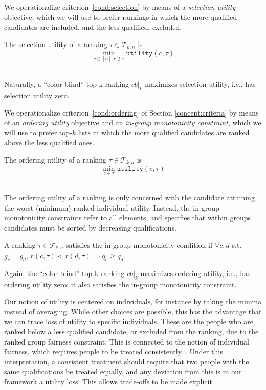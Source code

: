 %
We operationalize criterion~\ref{cond:selection} by means of a \emph{selection utility} objective, which we will use to prefer rankings in which the more qualified candidates are included, and the less qualified, excluded.
%
\begin{definition}
	\label{def:selectionFairness}
	The selection utility of a ranking 
	$\tau \in {\mathcal T}_{k,n}$ is \[\min_{c \in [n], c \notin \tau} \texttt{utility}(c,\tau)\].
\end{definition}
%
\noindent Naturally, a ``color-blind'' top-k ranking $\textit{cb}|_k$ maximizes selection utility, i.e., has selection utility zero.

%
We operationalize criterion~\ref{cond:ordering} of Section \ref{concept:criteria} by means of an \emph{ordering utility} objective and an \emph{in-group monotonicity constraint}, which we will use to prefer top-$k$ lists in which the more qualified candidates are ranked above the less qualified ones.

\begin{definition}
	\label{def:orderingFairness}
	The ordering utility of a ranking $\tau \in {\mathcal T}_{k,n}$ is \[\min_{c \in \tau} \texttt{utility}(c,\tau)\].
\end{definition}

\noindent The ordering utility of a ranking is only concerned with the candidate attaining the worst (minimum) ranked individual utility. Instead, the in-group monotonicity constraints refer to all elements, and specifies that within groups candidates must be sorted by decreasing qualifications.

\begin{definition}
	\label{def:inGroupMonotonicity}
	A ranking $\tau \in {\mathcal T}_{k,n}$ satisfies the in-group monotonicity condition if $\forall c,d$ s.t. $g_c = g_d$, $r(c,\tau) < r(d,\tau) \Rightarrow q_c \ge q_d$.
\end{definition}

\noindent Again, the ``color-blind'' top-k ranking $\textit{cb}|_k$ maximizes ordering utility, i.e., has ordering utility zero; it also satisfies the in-group monotonicity constraint.

\label{concept:our-utility-individual-fairness}
%
Our notion of utility is centered on individuals, for instance by taking the minima instead of averaging.
%
While other choices are possible, this has the advantage that we can trace loss of utility to specific individuals. These are the people who are ranked below a less qualified candidate, or excluded from the ranking, due to the ranked group fairness constraint.
%
This is connected to the notion of individual fairness, which requires people to be treated consistently~\cite{Dwork2012}. Under this interpretation, a consistent treatment should require that two people with the same qualifications be treated equally, and any deviation from this is in our framework a utility loss. This allows trade-offs to be made explicit.

